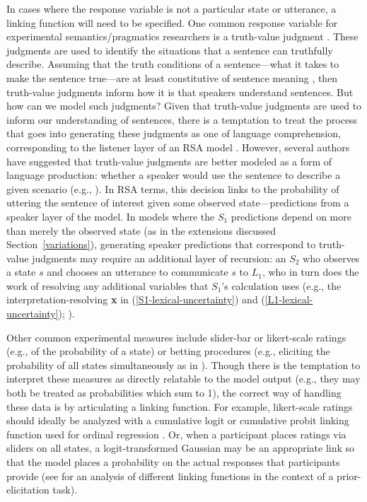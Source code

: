 \documentclass{sp}
\begin{document}
In cases where the response variable is not a particular state or utterance, a linking function will need to be specified. One common response variable for experimental semantics/pragmatics researchers is a truth-value judgment \citep{crainmckee1985,crainthornton1998}. These judgments are used to identify the situations that a sentence can truthfully describe. Assuming that the truth conditions of a sentence---what it takes to make the sentence true---are at least constitutive of sentence meaning \citep[e.g.,][]{chierchiamcconnellginet2000}, then truth-value judgments inform how it is that speakers understand sentences. But how can we model such judgments? Given that truth-value judgments are used to inform our understanding of sentences, there is a temptation to treat the process that goes into generating these judgments as one of language comprehension, corresponding to the listener layer of an RSA model \citep[e.g.,][]{PottsLassiter2016:Embedded-implic}. However, several authors have suggested that truth-value judgments are better modeled as a form of language production: whether a speaker would use the sentence to describe a given scenario (e.g., \citealp{degengoodman2014,Franke2016:Task-types-link,savinellietal2017,tesslergoodman2019,jasbietal2019}). In RSA terms, this decision links to the probability of uttering the sentence of interest given some observed state---predictions from a speaker layer of the model. In models where the $S_1$ predictions depend on more than merely the observed state (as in the extensions discussed Section~\ref{variations}), generating speaker predictions that correspond to truth-value judgments may require an additional layer of recursion: an $S_2$ who observes a state $s$ and chooses an utterance to communicate $s$ to $L_1$, who in turn does the work of resolving any additional variables that $S_1$'s calculation uses (e.g., the interpretation-resolving \textbf{x} in (\ref{S1-lexical-uncertainty}) and (\ref{L1-lexical-uncertainty}); \citealp{savinellietal2017}).

Other common experimental measures include slider-bar or likert-scale ratings (e.g., of the probability of a state) or betting procedures (e.g., eliciting the probability of all states simultaneously as in \citealp{frankgoodman2012}). 
Though there is the temptation to interpret these measures as directly relatable to the model output (e.g., they may both be treated as probabilities which sum to 1), the correct way of handling these data is by articulating a linking function.
For example, likert-scale ratings should ideally be analyzed with a cumulative logit or cumulative probit linking function used for ordinal regression \citep{Franke2014:Typical-use-of-,Franke2016:Task-types-link}.
Or, when a participant places ratings via sliders on all states, a logit-transformed Gaussian may be an appropriate link so that the model places a probability on the actual responses that participants provide (see \citealp{franke2016does} for an analysis of different linking functions in the context of a prior-elicitation task).
\end{document}
